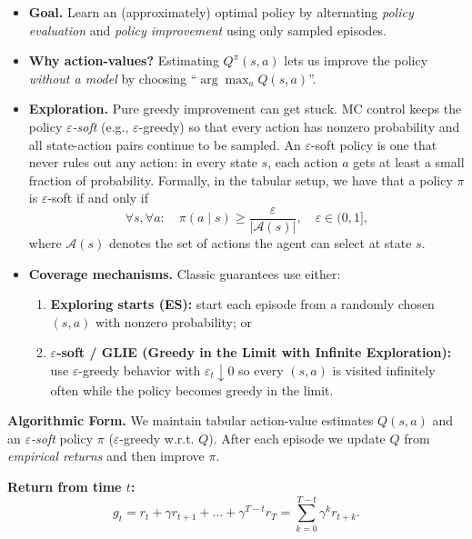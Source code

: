 \documentclass[
]{book}
\providecommand{\tightlist}{%
  \setlength{\itemsep}{0pt}\setlength{\parskip}{0pt}}
\theoremstyle{definition}
\theoremstyle{definition}
\theoremstyle{definition}
\theoremstyle{definition}
\theoremstyle{remark}
\begin{document}
\begin{itemize}
\item
  \textbf{Goal.} Learn an (approximately) optimal policy by alternating \emph{policy evaluation} and \emph{policy improvement} using only sampled episodes.
\item
  \textbf{Why action-values?} Estimating \(Q^\pi(s,a)\) lets us improve the policy \emph{without a model} by choosing ``\(\arg\max_a Q(s,a)\)''.
\item
  \textbf{Exploration.} Pure greedy improvement can get stuck. MC control keeps the policy \emph{\(\varepsilon\)-soft} (e.g., \(\varepsilon\)-greedy) so that every action has nonzero probability and all state-action pairs continue to be sampled. An \(\varepsilon\)-soft policy is one that never rules out any action: in every state \(s\), each action \(a\) gets at least a small fraction of probability. Formally, in the tabular setup, we have that a policy \(\pi\) is \(\varepsilon\)-soft if and only if
  \begin{equation}
  \forall s, \forall a: \quad \pi(a \mid s) \geq \frac{\varepsilon}{|\mathcal{A}(s)|}, \quad \varepsilon \in (0,1],
  \label{eq:epsilon-soft-policy}
  \end{equation}
  where \(\mathcal{A}(s)\) denotes the set of actions the agent can select at state \(s\).
\item
  \textbf{Coverage mechanisms.} Classic guarantees use either:

  \begin{enumerate}
  \def\labelenumi{\arabic{enumi})}
  \tightlist
  \item
    \textbf{Exploring starts (ES):} start each episode from a randomly chosen \((s,a)\) with nonzero probability; or\\
  \item
    \textbf{\(\varepsilon\)-soft / GLIE (Greedy in the Limit with Infinite Exploration):} use \(\varepsilon\)-greedy behavior with \(\varepsilon_t \downarrow 0\) so every \((s,a)\) is visited infinitely often while the policy becomes greedy in the limit.
  \end{enumerate}
\end{itemize}

\textbf{Algorithmic Form.}
We maintain tabular action-value estimates \(Q(s,a)\) and an \emph{\(\varepsilon\)-soft} policy \(\pi\) (\(\varepsilon\)-greedy w.r.t. \(Q\)). After each episode we update \(Q\) from \emph{empirical returns} and then improve \(\pi\).

\textbf{Return from time \(t\):}
\[
g_t = r_t + \gamma r_{t+1} + \dots + \gamma^{T-t} r_T = \sum_{k=0}^{T-t} \gamma^{k} r_{t+k}.
\]
\end{document}
